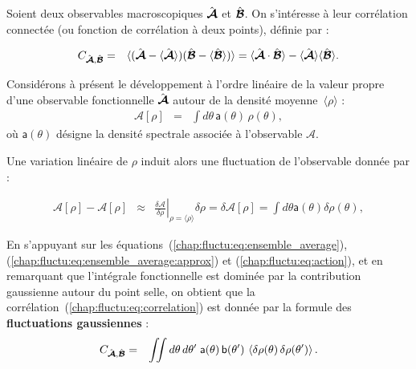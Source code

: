 
Soient deux observables macroscopiques $\hat{\bm{\mathcal{A}}}$ et $\hat{\bm{\mathcal{B}}}$. On s’intéresse à leur corrélation connectée (ou fonction de corrélation à deux points), définie par :

\begin{eqnarray}
	C_{\hat{\bm{\mathcal{A}}} , \hat{\bm{\mathcal{B}}} } & = & \langle  (\hat{\bm{\mathcal{A}}} - \langle \hat{\bm{\mathcal{A}}} \rangle  ) ( \hat{\bm{\mathcal{B}}} - \langle \hat{\bm{\mathcal{B}}} \rangle ) \rangle = \langle \hat{\bm{\mathcal{A}}} \cdot  \hat{\bm{\mathcal{B}}} \rangle -\langle \hat{\bm{\mathcal{A}}} \rangle \langle   \hat{\bm{\mathcal{B}}} \rangle . 
	\label{chap:fluctu:eq:correlation}	
\end{eqnarray}

Considérons à présent le développement à l’ordre linéaire de la valeur propre d’une observable fonctionnelle $\hat{\bm{\mathcal{A}}}$ autour de la densité moyenne~$\langle \rho \rangle$ :
\begin{eqnarray*}
	\mathcal{A}[\rho] &=& \int d\theta \, \mathsf{a}(\theta) \, \rho(\theta),
\end{eqnarray*}
où $\mathsf{a}(\theta)$ désigne la densité spectrale associée à l’observable $\mathcal{A}$.

Une variation linéaire de $\rho$ induit alors une fluctuation de l’observable donnée par :

\begin{eqnarray*}
	\mathcal{A}[\rho] - 	\mathcal{A}[\rho] & \approx &\left. \frac{\delta 	\mathcal{A}}{\delta \rho} \right|_{ \rho = \langle \rho \rangle } \delta \rho = \delta\mathcal{A}[\rho] = \int d \theta \mathsf{a}(\theta) 	\delta \rho(\theta) , 	
\end{eqnarray*}

En s’appuyant sur les équations~(\ref{chap:fluctu:eq:ensemble_average}), (\ref{chap:fluctu:eq:ensemble_average:approx}) et (\ref{chap:fluctu:eq:action}), et en remarquant que l’intégrale fonctionnelle est dominée par la contribution gaussienne autour du point selle, on obtient que la corrélation~(\ref{chap:fluctu:eq:correlation}) est donnée par la formule des \textbf{fluctuations gaussiennes} :
\begin{eqnarray}
	C_{\hat{\bm{\mathcal{A}}}, \hat{\bm{\mathcal{B}}}} &=& \iint d\theta \, d\theta' \; \mathsf{a}(\theta) \, \mathsf{b}(\theta') \, 
	\left\langle \delta \rho(\theta) \, \delta \rho(\theta') \right\rangle.
	\label{eq:2point}
\end{eqnarray}

